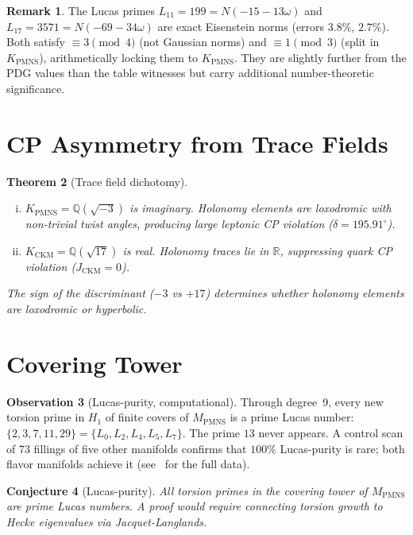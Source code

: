 \documentclass[11pt,a4paper]{article}
\newtheorem{theorem}{Theorem}
\newtheorem{conjecture}[theorem]{Conjecture}
\theoremstyle{definition}
\newtheorem{observation}[theorem]{Observation}
\newtheorem{remark}[theorem]{Remark}
\newcommand{\MPMNS}{M_{\mathrm{PMNS}}}
\newcommand{\KPMNS}{K_{\mathrm{PMNS}}}
\begin{document}
\begin{remark}
The Lucas primes $L_{11}=199=N(-15-13\omega)$ and
$L_{17}=3571=N(-69-34\omega)$ are exact Eisenstein norms
(errors $3.8\%$, $2.7\%$).
Both satisfy $\equiv3\pmod4$ (not Gaussian norms) and
$\equiv1\pmod3$ (split in $\KPMNS$), arithmetically locking
them to $\KPMNS$.
They are slightly further from the PDG values than the
table witnesses but carry additional number-theoretic significance.
\end{remark}

\section{CP Asymmetry from Trace Fields}
\label{sec:trace_fields}

\begin{theorem}[Trace field dichotomy]
\label{thm:dichotomy}
\begin{enumerate}[(i)]
\item $\KPMNS=\mathbb{Q}(\sqrt{-3})$ is imaginary.
  Holonomy elements are loxodromic with non-trivial twist angles,
  producing large leptonic CP violation ($\delta=195.91^\circ$).
\item $K_{\mathrm{CKM}}=\mathbb{Q}(\sqrt{17})$ is real.
  Holonomy traces lie in $\mathbb{R}$, suppressing quark CP
  violation ($J_{\mathrm{CKM}}=0$).
\end{enumerate}
The sign of the discriminant ($-3$ vs $+17$) determines whether
holonomy elements are loxodromic or hyperbolic.
\end{theorem}

\section{Covering Tower}
\label{sec:covering}

\begin{observation}[Lucas-purity, computational]
Through degree~9, every new torsion prime in $H_1$ of finite covers
of $\MPMNS$ is a prime Lucas number:
$\{2,3,7,11,29\}=\{L_0,L_2,L_4,L_5,L_7\}$.
The prime $13$ never appears.
A control scan of 73 fillings of five other manifolds confirms that
$100\%$ Lucas-purity is rare; both flavor manifolds achieve it
(see~\cite{Gentry:Covering} for the full data).
\end{observation}

\begin{conjecture}[Lucas-purity]
All torsion primes in the covering tower of $\MPMNS$ are prime
Lucas numbers. A proof would require connecting torsion growth to
Hecke eigenvalues via Jacquet-Langlands.
\end{conjecture}
\end{document}

